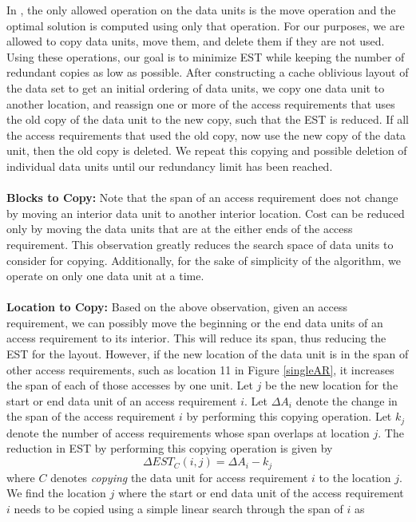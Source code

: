 In \cite{cacheobliviouslayout}, the only allowed operation on the data units is
the move operation and the optimal solution is computed using only that
operation. For our purposes, we are allowed to copy data units, move them, and
delete them if they are not used. Using these operations, our goal is to minimize EST
while keeping the number of redundant copies as low as possible. After constructing a cache oblivious layout 
of the data set to get an initial ordering of data units, we copy one data unit to another location, and reassign 
one or more of the access requirements that uses the old copy of the data unit to the new copy, such that the EST is reduced. 
If all the access requirements that used the old copy, now use the new copy of the data unit, then the old copy is deleted. 
We repeat this copying and possible deletion of individual data units until our redundancy limit has been reached. \\
\\
{\bf Blocks to Copy:} Note that the span of an access requirement does not
change by moving an interior data unit to another interior location. Cost can
be reduced only by moving the data units that are at the either ends of the access
requirement. This observation greatly reduces the search space of data units to
consider for copying. Additionally, for the sake of simplicity of the algorithm, we operate
on only one data unit at a time. \\
\\
{\bf Location to Copy:} Based on the above observation, given an access requirement, we can possibly move the beginning or the end data units of an access requirement to its interior. This will reduce its span, thus reducing the EST for the layout. However, if the new location of the data unit is in the span of other access requirements, such as location 11 in Figure \ref{singleAR}, it increases the span of each of those accesses by one unit. Let $j$ be the new location for the start or end data unit of an access requirement $i$. Let $\Delta A_i$ denote the change in the span of the access requirement $i$ by performing this copying operation. Let  $k_j$ denote the number of access requirements whose span overlaps at location $j$.  The reduction in EST by performing this copying operation is given by 
\[ 
\Delta EST_C(i,j) = \Delta A_i - k_j 
\]
where $C$ denotes {\it copying} the data unit for access requirement $i$ to the location $j$. We find the location $j$ where the start or end data unit of the access requirement $i$ needs to be copied  using a simple linear search through the span of $i$ as
